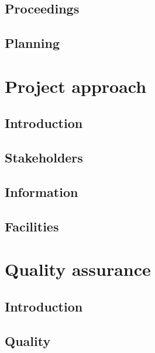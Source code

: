 \documentclass[]{article}
\begin{document}
\subsection{Proceedings}
\subsection{Planning}
\section{Project approach}
\subsection{Introduction}
\subsection{Stakeholders}
\subsection{Information}
\subsection{Facilities}
\section{Quality assurance}
\subsection{Introduction}
\subsection{Quality}

\newpage


\end{document}
